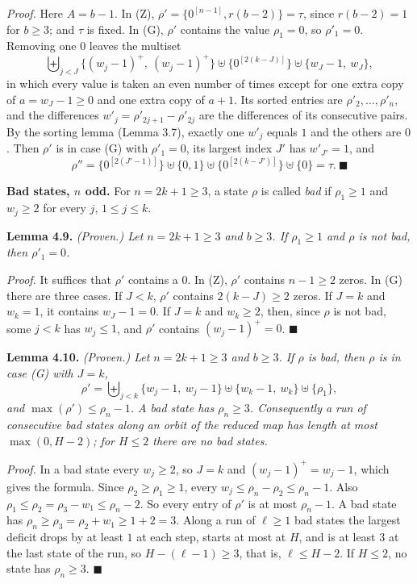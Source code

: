 \documentclass[11pt,letterpaper]{article}
\theoremstyle{paperstyle}
\theoremstyle{paperstyledef}
\theoremstyle{paperstylerem}
\begin{document}
\emph{Proof.} Here \(A = b-1\). In (Z), \(\rho' = \{0^{[n-1]}, r(b-2)\} = \tau\), since \(r(b-2) = 1\) for \(b \geq 3\); and \(\tau\) is fixed. In (G), \(\rho'\) contains the value \(\rho_1 = 0\), so \(\rho'_1 = 0\). Removing one \(0\) leaves the multiset \[\biguplus_{j<J} \{(w_j - 1)^+,\ (w_j - 1)^+\} \uplus \{0^{[2(k-J)]}\} \uplus \{w_J - 1,\ w_J\},\] in which every value is taken an even number of times except for one extra copy of \(a = w_J - 1 \geq 0\) and one extra copy of \(a+1\). Its sorted entries are \(\rho'_2, \dots, \rho'_n\), and the differences \(w'_j = \rho'_{2j+1} - \rho'_{2j}\) are the differences of its consecutive pairs. By the sorting lemma (Lemma 3.7), exactly one \(w'_j\) equals \(1\) and the others are \(0\). Then \(\rho'\) is in case (G) with \(\rho'_1 = 0\), its largest index \(J'\) has \(w'_{J'} = 1\), and \[\rho'' = \{0^{[2(J'-1)]}\} \uplus \{0, 1\} \uplus \{0^{[2(k-J')]}\} \uplus \{0\} = \tau. \ \blacksquare\]

\textbf{Bad states, \(n\) odd.} For \(n = 2k+1 \geq 3\), a state \(\rho\) is called \emph{bad} if \(\rho_1 \geq 1\) and \(w_j \geq 2\) for every \(j\), \(1 \leq j \leq k\).

\textbf{Lemma 4.9.} \emph{(Proven.) Let \(n = 2k+1 \geq 3\) and \(b \geq 3\). If \(\rho_1 \geq 1\) and \(\rho\) is not bad, then \(\rho'_1 = 0\).}

\emph{Proof.} It suffices that \(\rho'\) contains a \(0\). In (Z), \(\rho'\) contains \(n - 1 \geq 2\) zeros. In (G) there are three cases. If \(J < k\), \(\rho'\) contains \(2(k-J) \geq 2\) zeros. If \(J = k\) and \(w_k = 1\), it contains \(w_J - 1 = 0\). If \(J = k\) and \(w_k \geq 2\), then, since \(\rho\) is not bad, some \(j < k\) has \(w_j \leq 1\), and \(\rho'\) contains \((w_j - 1)^+ = 0\). \(\blacksquare\)

\textbf{Lemma 4.10.} \emph{(Proven.) Let \(n = 2k+1 \geq 3\) and \(b \geq 3\). If \(\rho\) is bad, then \(\rho\) is in case (G) with \(J = k\),} \[\rho' = \biguplus_{j<k} \{w_j - 1,\ w_j - 1\} \uplus \{w_k - 1,\ w_k\} \uplus \{\rho_1\},\] \emph{and \(\max(\rho') \leq \rho_n - 1\). A bad state has \(\rho_n \geq 3\). Consequently a run of consecutive bad states along an orbit of the reduced map has length at most \(\max(0, H-2)\); for \(H \leq 2\) there are no bad states.}

\emph{Proof.} In a bad state every \(w_j \geq 2\), so \(J = k\) and \((w_j - 1)^+ = w_j - 1\), which gives the formula. Since \(\rho_2 \geq \rho_1 \geq 1\), every \(w_j \leq \rho_n - \rho_2 \leq \rho_n - 1\). Also \(\rho_1 \leq \rho_2 = \rho_3 - w_1 \leq \rho_n - 2\). So every entry of \(\rho'\) is at most \(\rho_n - 1\). A bad state has \(\rho_n \geq \rho_3 = \rho_2 + w_1 \geq 1 + 2 = 3\). Along a run of \(\ell \geq 1\) bad states the largest deficit drops by at least \(1\) at each step, starts at most at \(H\), and is at least \(3\) at the last state of the run, so \(H - (\ell-1) \geq 3\), that is, \(\ell \leq H - 2\). If \(H \leq 2\), no state has \(\rho_n \geq 3\). \(\blacksquare\)
\end{document}
